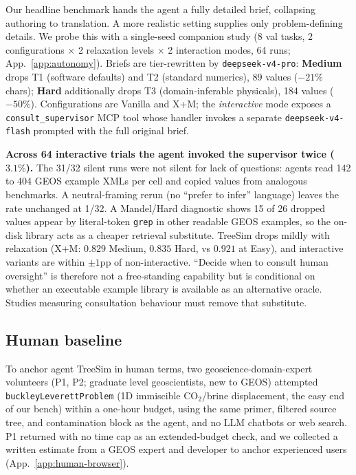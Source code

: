 \documentclass{article}
\begin{document}
Our headline benchmark hands the agent a fully detailed brief, collapsing authoring to translation. A more realistic setting supplies only problem-defining details. We probe this with a single-seed companion study (8 val tasks, 2 configurations $\times$ 2 relaxation levels $\times$ 2 interaction modes, 64 runs; App.~\ref{app:autonomy}). Briefs are tier-rewritten by \texttt{deepseek-v4-pro}: \textbf{Medium} drops T1 (software defaults) and T2 (standard numerics), 89 values ($-21\%$ chars); \textbf{Hard} additionally drops T3 (domain-inferable physicals), 184 values ($-50\%$). Configurations are Vanilla and X+M; the \emph{interactive} mode exposes a \texttt{consult\_supervisor} MCP tool whose handler invokes a separate \texttt{deepseek-v4-flash} prompted with the full original brief.

\textbf{Across 64 interactive trials the agent invoked the supervisor twice ($3.1\%$).} The 31/32 silent runs were not silent for lack of questions: agents read 142 to 404 GEOS example XMLs per cell and copied values from analogous benchmarks. A neutral-framing rerun (no ``prefer to infer'' language) leaves the rate unchanged at 1/32. A Mandel/Hard diagnostic shows 15 of 26 dropped values appear by literal-token \texttt{grep} in other readable GEOS examples, so the on-disk library acts as a cheaper retrieval substitute. TreeSim drops mildly with relaxation (X+M: $0.829$ Medium, $0.835$ Hard, vs $0.921$ at Easy), and interactive variants are within $\pm 1$pp of non-interactive. ``Decide when to consult human oversight'' is therefore not a free-standing capability but is conditional on whether an executable example library is available as an alternative oracle. Studies measuring consultation behaviour must remove that substitute.

\subsection{Human baseline}
\label{subsec:human-baseline}

To anchor agent TreeSim in human terms, two geoscience-domain-expert volunteers (P1, P2; graduate level geoscientists, new to GEOS) attempted \texttt{buckleyLeverettProblem} (1D immiscible CO$_2$/brine displacement, the easy end of our bench) within a one-hour budget, using the same primer, filtered source tree, and contamination block as the agent, and no LLM chatbots or web search. P1 returned with no time cap as an extended-budget check, and we collected a written estimate from a GEOS expert and developer to anchor experienced users (App.~\ref{app:human-browser}).
\end{document}
